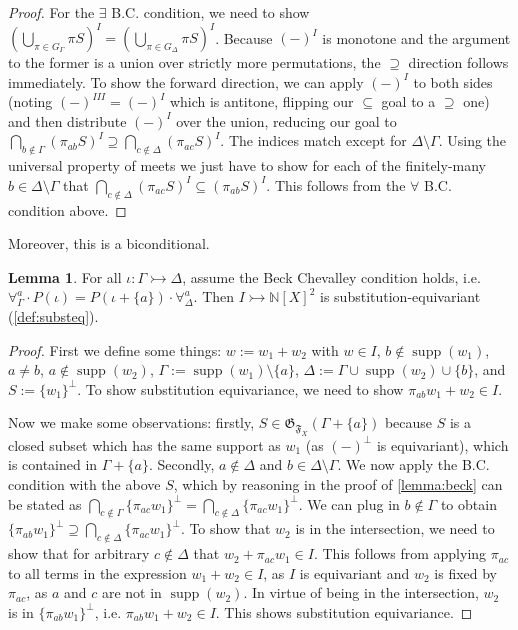 \documentclass{article}
\theoremstyle{definition}
\newtheorem{lemma}{Lemma}[section]
\newcommand{\N}{\mathbb{N}}
\newcommand{\F}{\mathfrak{F}}
\newcommand{\G}{\mathfrak{G}}
\newcommand{\supp}{\operatorname{supp}}
\begin{document}
\begin{proof}
For the $\exists$ B.C. condition, we need to show $(\bigcup_{\pi \in G_\Gamma} \pi S)^{I}=(\bigcup_{\pi \in G_\Delta} \pi S)^{I}$. Because $(-)^{I}$ is monotone and the argument to the former is a union over strictly more permutations, the $\supseteq$ direction follows immediately. To show the forward direction, we can apply $(-)^I$ to both sides (noting $(-)^{III}=(-)^{I}$ which is antitone, flipping our $\subseteq$ goal to a $\supseteq$ one) and then distribute $(-)^{I}$ over the union, reducing our goal to $\bigcap_{b\notin \Gamma}(\pi_{ab} S)^I \supseteq \bigcap_{c \notin \Delta}(\pi_{ac} S)^I$. The indices match except for $\Delta\setminus \Gamma$. Using the universal property of meets we just have to show for each of the finitely-many $b \in \Delta\setminus \Gamma$ that $ \bigcap_{c \notin \Delta}(\pi_{ac} S)^I\subseteq (\pi_{ab} S)^I$. This follows from the $\forall$ B.C. condition above.

\end{proof}

Moreover, this is a biconditional.


\begin{lemma}
        \label{lemma:beck2}
    For all $\iota\colon \Gamma\rightarrowtail \Delta$, assume the Beck Chevalley condition holds, i.e. $\forall^{a}_\Gamma \cdot P(\iota) = P(\iota+\{a\}) \cdot \forall^{a}_\Delta$.  Then $I\rightarrowtail \N[X]^2$ is substitution-equivariant (\cref{def:substeq}).

\end{lemma}

\begin{proof}
    First we define some things: $w := w_1+w_2$ with $w\in I$, $b \notin \supp(w_1)$, $a\ne b$, $a \notin \supp(w_2)$,  $\Gamma:=\supp(w_1)\setminus\{a\}$, $\Delta:=\Gamma \cup \supp(w_2)\cup\{b\}$, and $S:=\{w_1\}^\bot$. To show substitution equivariance, we need to show $\pi_{ab}w_1 + w_2 \in I$.
    
    Now we make some observations: firstly, $S \in \G_{\F_X}(\Gamma+\{a\})$ because $S$ is a closed subset which has the same support as $w_1$ (as $(-)^\bot$ is equivariant), which is contained in $\Gamma+\{a\}$. Secondly, $a \notin \Delta$ and $b \in \Delta\setminus \Gamma$. We now apply the B.C. condition with the above $S$, which by reasoning in the proof of \cref{lemma:beck} can be stated as $\bigcap_{c \notin \Gamma}\{\pi_{ac} w_1\}^\bot=\bigcap_{c \notin \Delta}\{\pi_{ac} w_1\}^\bot$. We can plug in $b \notin \Gamma$ to obtain $\{\pi_{ab} w_1\}^\bot\supseteq \bigcap_{c \notin \Delta}\{\pi_{ac} w_1\}^\bot$. To show that $w_2$ is in the intersection, we need to show that for arbitrary $c \notin \Delta$ that $w_2 + \pi_{ac} w_1 \in I$. This follows from applying $\pi_{ac}$ to all terms in the expression $w_1+w_2 \in I$, as $I$ is equivariant and $w_2$ is fixed by $\pi_{ac}$, as $a$ and $c$ are not in $\supp(w_2)$. In virtue of being in the intersection, $w_2$ is in $\{\pi_{ab} w_1\}^\bot$, i.e. $\pi_{ab}w_1 + w_2 \in I$. This shows substitution equivariance.
\end{proof}
\end{document}
